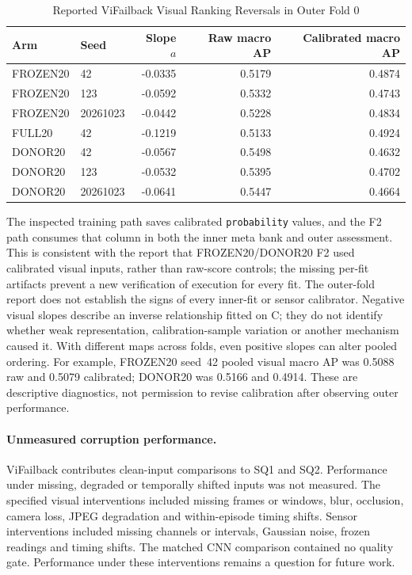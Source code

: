 \begin{table}[htbp]
\caption{Reported ViFailback Visual Ranking Reversals in Outer Fold 0}
\label{tab:vif-calibration}\centering\small
\begin{tabular}{llrrr}\toprule
Arm & Seed & Slope $a$ & Raw macro AP & Calibrated macro AP\\\midrule
FROZEN20 & 42 & -0.0335 & 0.5179 & 0.4874\\
FROZEN20 & 123 & -0.0592 & 0.5332 & 0.4743\\
FROZEN20 & 20261023 & -0.0442 & 0.5228 & 0.4834\\
FULL20 & 42 & -0.1219 & 0.5133 & 0.4924\\
DONOR20 & 42 & -0.0567 & 0.5498 & 0.4632\\
DONOR20 & 123 & -0.0532 & 0.5395 & 0.4702\\
DONOR20 & 20261023 & -0.0641 & 0.5447 & 0.4664\\
\bottomrule\end{tabular}
\end{table}

The inspected training path saves calibrated \texttt{probability} values, and the F2
path consumes that column in both the inner meta bank and outer assessment. This is
consistent with the report that FROZEN20/DONOR20 F2 used calibrated visual inputs,
rather than raw-score controls; the missing per-fit artifacts prevent a new verification
of execution for every fit. The outer-fold report does not establish the signs of every
inner-fit or sensor calibrator. Negative visual slopes describe an inverse relationship
fitted on C; they do not identify whether weak representation, calibration-sample
variation or another mechanism caused it. With different maps across folds, even
positive slopes can alter pooled ordering. For example, FROZEN20 seed~42 pooled visual
macro AP was 0.5088 raw and 0.5079 calibrated; DONOR20 was 0.5166 and 0.4914.
These are descriptive diagnostics, not permission to revise calibration after observing
outer performance.

\paragraph{Unmeasured corruption performance.}
ViFailback contributes clean-input comparisons to SQ1 and SQ2. Performance under missing,
degraded or temporally shifted inputs was not measured. The specified visual interventions
included missing frames or windows, blur, occlusion, camera loss, JPEG degradation and
within-episode timing shifts. Sensor interventions included missing channels or
intervals, Gaussian noise, frozen readings and timing shifts. The matched CNN comparison
contained no quality gate. Performance under these interventions remains a question for
future work.

